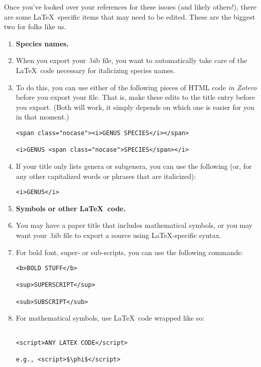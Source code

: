 \documentclass[11pt]{article}
\begin{document}
Once you've looked over your references for these issues (and likely others!), there are some \LaTeX\ specific items that may need to be edited. These are the biggest two for folks like us.


\begin{enumerate}
\item[]{\textbf{Species names.}}
\item[]{When you export your .bib file, you want to automatically take care of the \LaTeX\ code necessary for italicizing species names.} 
\item{To do this, you can use either of the following pieces of HTML code \textit{in Zotero} before you export your file. That is, make these edits to the title entry before you export. (Both will work, it simply depends on which one is easier for you in that moment.)
\begin{verbatim}
<span class="nocase"><i>GENUS SPECIES</i></span>

<i>GENUS <span class="nocase">SPECIES</span></i>
\end{verbatim}
}
\item{If your title only lists genera or subgenera, you can use the following (or, for any other capitalized words or phrases that are italicized):
\begin{verbatim}
<i>GENUS</i>
\end{verbatim}
}

\item[]{\textbf{Symbols or other \LaTeX\ code.}}
\item[]{You may have a paper title that includes mathematical symbols, or you may want your .bib file to export a source using \LaTeX-specific syntax.}
\item{For bold font, super- or sub-scripts, you can use the following commands:
\begin{verbatim}
<b>BOLD STUFF</b>

<sup>SUPERSCRIPT</sup>

<sub>SUBSCRIPT</sub>

\end{verbatim}
}
\item{For mathematical symbols, use \LaTeX\ code wrapped like so:
\begin{verbatim}

<script>ANY LATEX CODE</script>

e.g., <script>$\phi$</script>

\end{verbatim}
}

\end{enumerate}
\end{document}

